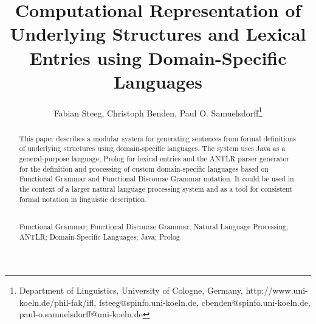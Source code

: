 \documentclass[a4paper, halfparskip, onecolumn, abstractoff, final]{scrartcl}
\begin{document}
\subject{Paper for \emph{Advances in FDG} based on a Poster presented at ICFG12}
\title{\Large Computational Representation of Underlying Structures and Lexical Entries using Domain-Specific Languages}
\author{Fabian Steeg, Christoph Benden, Paul O. Samuelsdorff\footnote{Department of Linguistics, University of Cologne, Germany, http://www.uni-koeln.de/phil-fak/ifl, fsteeg@spinfo.uni-koeln.de, cbenden@spinfo.uni-koeln.de, paul-o.samuelsdorff@uni-koeln.de}}

\maketitle

\begin{abstract}This paper describes a modular system for generating sentences from formal definitions of underlying structures using domain-specific languages. The system uses Java as a general-purpose language, Prolog for lexical entries and the ANTLR parser generator for the definition and processing of custom domain-specific languages based on Functional Grammar and Functional Discourse Grammar notation. It could be used in the context of a larger natural language processing system and as a tool for consistent formal notation in linguistic description.
\\\\\begin{center}
Functional Grammar; Functional Discourse Grammar; Natural Language Processing; ANTLR; Domain-Specific Languages; Java; Prolog
\end{center}
\end{abstract}
\doublespacing



\end{document}
